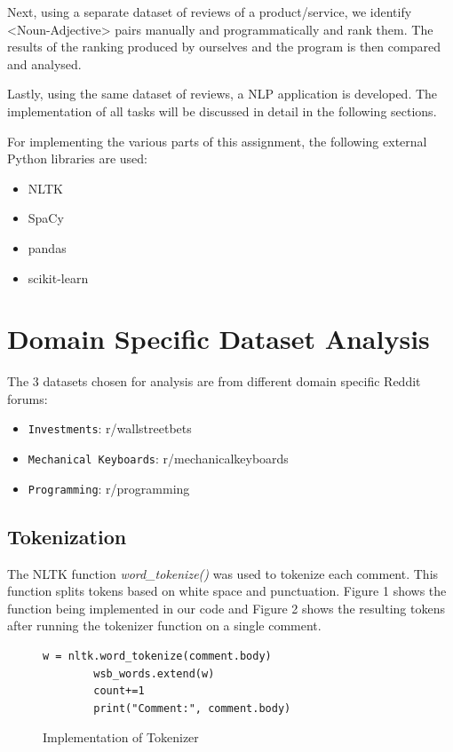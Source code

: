 \documentclass[sigconf,nonacm=true]{acmart}
\begin{document}
Next, using a separate dataset of reviews of a product/service, we identify <Noun-Adjective> pairs manually and programmatically and rank them. The results of the ranking produced by ourselves and the program is then compared and analysed. 

Lastly, using the same dataset of reviews, a NLP application is developed. The implementation of all tasks will be discussed in detail in the following sections.

For implementing the various parts of this assignment, the following external Python libraries are used:
\begin{itemize}
	\item NLTK
	\item SpaCy
	\item pandas
	\item scikit-learn
\end{itemize}

\section{Domain Specific Dataset Analysis}
The 3 datasets chosen for analysis are from different domain specific Reddit forums:
\begin{itemize}
	\item {\verb|Investments|}: r/wallstreetbets
	\item {\verb|Mechanical Keyboards|}: r/mechanicalkeyboards
	\item {\verb|Programming|}: r/programming
\end{itemize}

\subsection{Tokenization} 
The NLTK function \textit{word\_tokenize()} was used to tokenize each comment. This function splits tokens based on white space and punctuation. Figure 1 shows the function being implemented in our code and Figure 2 shows the resulting tokens after running the tokenizer function on a single comment. \bigskip

\renewcommand{\lstlistingname}{Figure}%
\renewcommand{\lstlistlistingname}{List of \lstlistingname s}%

\begin{figure}[H]
	\begin{lstlisting}[gobble=10]
	    w = nltk.word_tokenize(comment.body)
	    wsb_words.extend(w)
	    count+=1
	    print("Comment:", comment.body)
	\end{lstlisting}
	\caption{Implementation of Tokenizer}
\end{figure}
\end{document}
